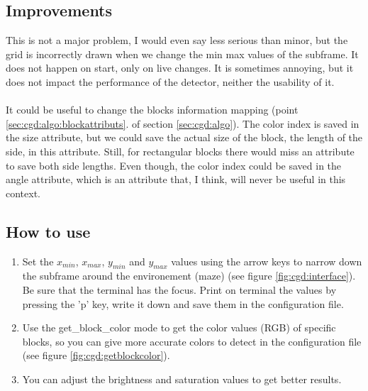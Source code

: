 \subsection{Improvements}
\label{sec:cgd:improvements}

This is not a major problem, I would even say less serious than 
minor, but the grid is incorrectly drawn when we change the 
min max values of the subframe. It does not happen on start, 
only on live changes. It is sometimes annoying, but it does not 
impact the performance of the detector, neither the usability of it.
\\
\\
It could be useful to change the blocks information mapping 
(point \ref{sec:cgd:algo:blockattributs}. of 
section \ref{sec:cgd:algo}). The color 
index is saved in the size attribute, but we could save the 
actual size of the block, the length of the side, in this attribute. 
Still, for rectangular blocks there would miss an attribute to save 
both side lengths. Even though, the color index could be saved in the 
angle attribute, which is an attribute that,
I think, will never be useful in this context. 

\subsection{How to use}
\label{sec:cgd:howto}
    \begin{enumerate}
        \item Set the $x_{min}$, $x_{max}$, $y_{min}$ and $y_{max}$ 
            values using the arrow keys
            to narrow down the subframe around the environement (maze)
            (see figure \ref{fig:cgd:interface}). Be sure 
            that the terminal has the focus. Print on terminal the values
            by pressing the 'p' key, 
            write it down and save them in the configuration file.
        \item Use the get\_block\_color mode to get the color values (RGB) 
            of specific blocks, so you can give more accurate colors to 
            detect in the configuration file (see 
            figure \ref{fig:cgd:getblockcolor}).
        \item You can adjust the brightness and saturation values to get 
            better results.
    \end{enumerate}

